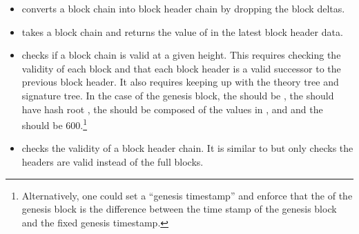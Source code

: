 \begin{itemize}
\item {} converts a block chain into block header chain by dropping the block deltas.
\item {} takes a block chain and returns the value of {} in the latest block header data.
\item {} checks if a block chain is valid at a given height.
This requires checking the validity of each block and that each block header is a valid
successor to the previous block header. It also requires keeping up with the
theory tree and signature tree.
In the case of the genesis block, the {} should be {},
the {} should have hash root {},
the {} should be composed of the values in {},
{} and {}
and the {} should be $600$.\footnote{Alternatively, one could set a ``genesis timestamp'' and enforce that the {} of the genesis block is the difference between the time stamp of the genesis block and the fixed genesis timestamp.}
\item {} checks the validity of a block header chain.
It is similar to {} but only checks the headers are valid
instead of the full blocks.
\end{itemize}
